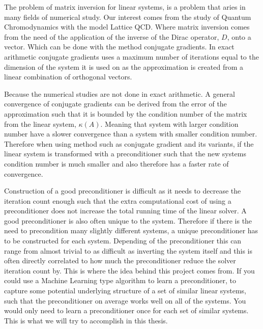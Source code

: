 The problem of matrix inversion for linear systems, is a problem that aries in many fields of numerical study. Our interest comes from the study of Quantum Chromodynamics with the model Lattice QCD. Where matrix inversion comes from the need of the application of the inverse of the Dirac operator, \(D\), onto a vector. Which can be done with the method conjugate gradients. In exact arithmetic conjugate gradients uses a maximum number of iterations equal to the dimension of the system it is used on \cite{Vorst03} as the approximation is created from a linear combination of orthogonal vectors.

Because the numerical studies are not done in exact arithmetic. A general convergence of conjugate gradients can be derived from the error of the approximation such that it is bounded by the condition number of the matrix from the linear system, \(\kappa(A)\). Meaning that system with larger condition number have a slower convergence than a system with smaller condition number. Therefore when using method such as conjugate gradient and its variants, if the linear system is transformed with a preconditioner such that the new systems condition number is much smaller and also therefore has a faster rate of convergence.

Construction of a good preconditioner is difficult as it needs to decrease the iteration count enough such that the extra computational cost of using a preconditioner does not increase the total running time of the linear solver. A good preconditioner is also often unique to the system. Therefore if there is the need to precondition many slightly different systems, a unique preconditioner has to be constructed for each system. Depending of the preconditioner this can range from almost trivial to as difficult as inverting the system itself and this is often directly correlated to how much the preconditioner reduce the solver iteration count by. This is where the idea behind this project comes from. If you could use a Machine Learning type algorithm to learn a preconditioner, to capture some potential underlying structure of a set of similar linear systems, such that the preconditioner on average works well on all of the systems. You would only need to learn a preconditioner once for each set of similar systems. This is what we will try to accomplish in this thesis.

